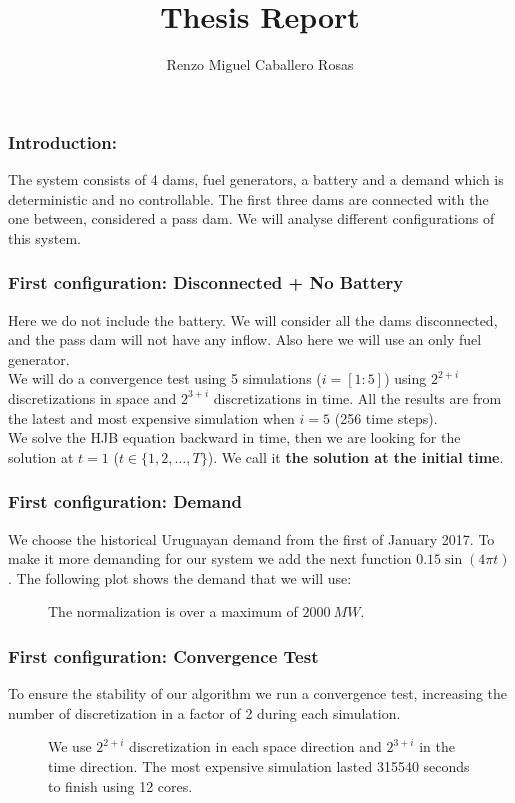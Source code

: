 \documentclass[aspectratio=169]{beamer}\usepackage[utf8]{inputenc}
\title{Thesis Report}
\subtitle{Renzo Miguel Caballero Rosas}
\begin{document}
\begin{frame}
\titlepage
\end{frame}

\begin{frame}\frametitle{Introduction:}
The system consists of 4 dams, fuel generators, a battery and a demand which is deterministic and no controllable. The first three dams are connected with the one between, considered a pass dam. We will analyse different configurations of this system.\begin{figure}[ht!]
\centering
{}
\end{figure}
\end{frame}

\begin{frame}\frametitle{First configuration: Disconnected + No Battery}
Here we do not include the battery. We will consider all the dams disconnected, and the pass dam will not have any inflow. Also here we will use an only fuel generator.\\
We will do a convergence test using 5 simulations ($i=[1:5]$) using $2^{2+i}$ discretizations in space and $2^{3+i}$ discretizations in time. All the results are from the latest and most expensive simulation when $i=5$ (256 time steps).\\
We solve the HJB equation backward in time, then we are looking for the solution at $t=1$ ($t\in\{1,2,\dots,T\}$). We call it \textbf{the solution at the initial time}.
\end{frame}

\begin{frame}\frametitle{First configuration: Demand}
We choose the historical Uruguayan demand from the first of January 2017. To make it more demanding for our system we add the next function $0.15\sin(4\pi t)$. The following plot shows the demand that we will use:
\begin{figure}[ht!]
\centering
{}
\caption{The normalization is over a maximum of $\SI{2000}{MW}$.}
\end{figure}
\end{frame}

\begin{frame}\frametitle{First configuration: Convergence Test}
To ensure the stability of our algorithm we run a convergence test, increasing the number of discretization in a factor of 2 during each simulation.
\begin{figure}[ht!]
\centering
{}
\caption{We use $2^{2+i}$ discretization in each space direction and $2^{3+i}$ in the time direction. The most expensive simulation lasted 315540 seconds to finish using 12 cores.}
\end{figure}
\end{frame}
\end{document}
